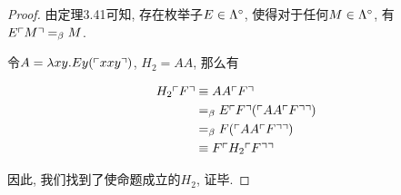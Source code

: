 \begin{proof}
    由定理3.41可知, 存在枚举子$E\in\Lambda^\circ$, 使得对于任何$M\in\Lambda^\circ$, 有$E\ulcorner{M}\urcorner=_{\beta} M$.
    
    令$A=\lambda xy.Ey(\ulcorner{xxy}\urcorner)$, $H_2=AA$, 那么有

    \begin{align*}
        H_2\ulcorner{F}\urcorner&\equiv AA\ulcorner{F}\urcorner\\
        &=_{\beta} E\ulcorner{F}\urcorner(\ulcorner{AA\ulcorner{F}\urcorner}\urcorner)\\
        &=_{\beta} F(\ulcorner{AA\ulcorner{F}\urcorner}\urcorner)\\
        &\equiv F\ulcorner{H_2\ulcorner{F}\urcorner}\urcorner
    \end{align*}

    因此, 我们找到了使命题成立的$H_2$, 证毕.
\end{proof}